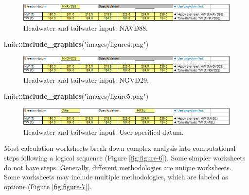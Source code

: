 \documentclass[
]{book}
\newenvironment{Shaded}{\begin{snugshade}}{\end{snugshade}}
\newcommand{\FunctionTok}[1]{\textcolor[rgb]{0.13,0.29,0.53}{\textbf{#1}}}
\newcommand{\NormalTok}[1]{#1}
\newcommand{\SpecialCharTok}[1]{\textcolor[rgb]{0.81,0.36,0.00}{\textbf{#1}}}
\newcommand{\StringTok}[1]{\textcolor[rgb]{0.31,0.60,0.02}{#1}}
\begin{document}
\begin{figure}

{\centering \includegraphics{images/figure3} 

}

\caption{Headwater and tailwater input: NAVD88.}\label{fig:figure-3}
\end{figure}

\begin{Shaded}
\begin{Highlighting}[]
\NormalTok{knitr}\SpecialCharTok{::}\FunctionTok{include\_graphics}\NormalTok{(}\StringTok{"images/figure4.png"}\NormalTok{)}
\end{Highlighting}
\end{Shaded}

\begin{figure}

{\centering \includegraphics{images/figure4} 

}

\caption{Headwater and tailwater input: NGVD29.}\label{fig:figure-4}
\end{figure}

\begin{Shaded}
\begin{Highlighting}[]
\NormalTok{knitr}\SpecialCharTok{::}\FunctionTok{include\_graphics}\NormalTok{(}\StringTok{"images/figure5.png"}\NormalTok{)}
\end{Highlighting}
\end{Shaded}

\begin{figure}

{\centering \includegraphics{images/figure5} 

}

\caption{Headwater and tailwater input: User-specified datum.}\label{fig:figure-5}
\end{figure}

Most calculation worksheets break down complex analysis into computational steps following a logical sequence (Figure \ref{fig:figure-6}). Some simpler worksheets do not have steps. Generally, different methodologies are unique worksheets. Some worksheets may include multiple methodologies, which are labeled as options (Figure \ref{fig:figure-7}).
\end{document}
